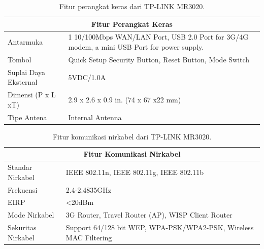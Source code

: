     \begin{table}[ht!]
    \centering
    \caption{Fitur perangkat keras dari TP-LINK MR3020.}
    \label{mr3020-hardware-feature}
    \begin{tabular}{|l|p{10cm}|}
    \hline
    \multicolumn{2}{|c|}{Fitur Perangkat Keras}                                                                                                \\ \hline
    Antarmuka             & 1 10/100Mbps WAN/LAN Port, USB 2.0 Port for 3G/4G modem, a mini USB Port for power supply.   \\ \hline
    Tombol                & Quick Setup Security Button, Reset Button, Mode Switch                                                             \\ \hline
    Suplai Daya Eksternal & 5VDC/1.0A                                                                                                          \\ \hline
    Dimensi (P x L xT)    & 2.9 x 2.6 x 0.9 in. (74 x 67 x22 mm)                                                                               \\ \hline
    Tipe Antena           & Internal Antenna                                                                                                   \\ \hline
    \end{tabular}
    \end{table}

    \begin{table}[ht!]
    \centering
    \caption{Fitur komunikasi nirkabel dari TP-LINK MR3020.}
    \label{mr3020-wireless-feature}
    \begin{tabular}{|l|p{10cm}|}
    \hline
    \multicolumn{2}{|c|}{Fitur Komunikasi Nirkabel}                                         \\ \hline
    Standar Nirkabel   & IEEE 802.11n, IEEE 802.11g, IEEE 802.11b                           \\ \hline
    Frekuensi          & 2.4-2.4835GHz                                                      \\ \hline
    EIRP               & <20dBm                                                             \\ \hline
    Mode Nirkabel      & 3G Router, Travel Router (AP), WISP Client Router                  \\ \hline
    Sekuritas Nirkabel & Support 64/128 bit WEP, WPA-PSK/WPA2-PSK, Wireless MAC Filtering   \\ \hline
    \end{tabular}
    \end{table}
